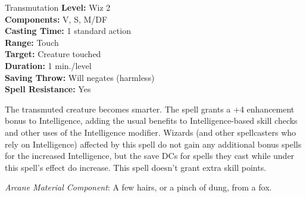 {Transmutation}
{
	\textbf{Level:}
	Wiz 2\\
	\textbf{Components:}
	V, S, M/DF\\
	\textbf{Casting Time:}
	1 standard action\\
	\textbf{Range:}
	Touch\\
	\textbf{Target:}
	Creature touched\\
	\textbf{Duration:}
	1 min./level\\
	\textbf{Saving Throw:}
	Will negates (harmless)\\
	\textbf{Spell Resistance:}
	Yes\\
}
{
	The transmuted creature becomes smarter. The spell grants a +4 enhancement bonus to Intelligence, adding the usual benefits to Intelligence-based skill checks and other uses of the Intelligence modifier. Wizards (and other spellcasters who rely on Intelligence) affected by this spell do not gain any additional bonus spells for the increased Intelligence, but the save DCs for spells they cast while under this spell's effect do increase. This spell doesn't grant extra skill points.

	\textit{Arcane Material Component}:
	A few hairs, or a pinch of dung, from a fox.

}
